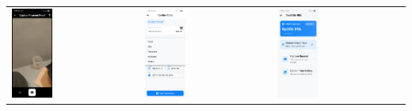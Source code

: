 \begin{tabular}{lll}
    \includegraphics[width=0.33\textwidth]{images/UI/qris-cam.jpg} &
    \includegraphics[width=0.33\textwidth]{images/UI/qris-cat.jpg} &
    \includegraphics[width=0.33\textwidth]{images/UI/qris-choose-input.jpg}

\end{tabular}
